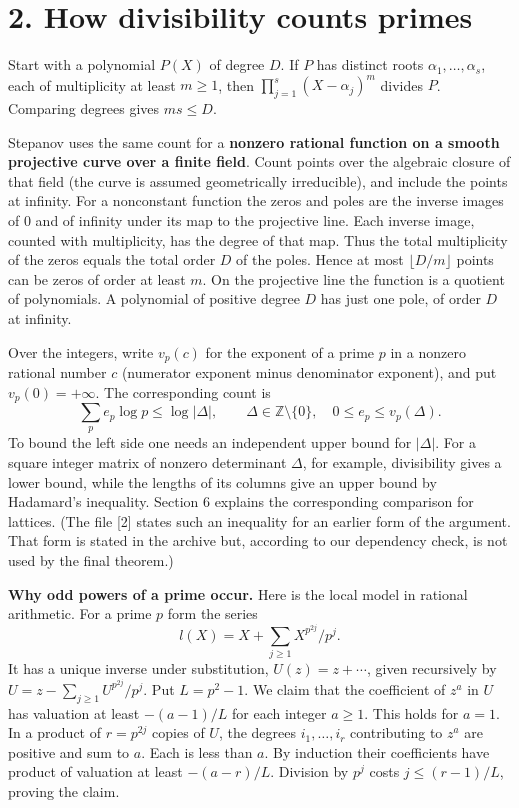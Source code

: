 \documentclass[11pt,letterpaper]{article}
\begin{document}
{\newpage
\section*{2. How divisibility counts primes}

Start with a polynomial $P(X)$ of degree $D$. If $P$ has distinct roots $\alpha_1,\ldots,\alpha_s$, each of multiplicity at least $m\ge1$, then $\prod_{j=1}^s(X-\alpha_j)^m$ divides $P$. Comparing degrees gives $ms\le D$.

Stepanov uses the same count for a \textbf{nonzero rational function on a smooth projective curve over a finite field}. Count points over the algebraic closure of that field (the curve is assumed geometrically irreducible), and include the points at infinity. For a nonconstant function the zeros and poles are the inverse images of $0$ and of infinity under its map to the projective line. Each inverse image, counted with multiplicity, has the degree of that map. Thus the total multiplicity of the zeros equals the total order $D$ of the poles. Hence at most $\lfloor D/m\rfloor$ points can be zeros of order at least $m$. On the projective line the function is a quotient of polynomials. A polynomial of positive degree $D$ has just one pole, of order $D$ at infinity.

Over the integers, write $v_p(c)$ for the exponent of a prime $p$ in a nonzero rational number $c$ (numerator exponent minus denominator exponent), and put $v_p(0)=+\infty$. The corresponding count is
\begin{equation}\label{D:41}
 \sum_p e_p\log p\le\log|\Delta|,\qquad
 \Delta\in\mathbb Z\setminus\{0\},\quad 0\le e_p\le v_p(\Delta).
\end{equation}
To bound the left side one needs an independent upper bound for $|\Delta|$. For a square integer matrix of nonzero determinant $\Delta$, for example, divisibility gives a lower bound, while the lengths of its columns give an upper bound by Hadamard's inequality. Section 6 explains the corresponding comparison for lattices. (The file [2] states such an inequality for an earlier form of the argument. That form is stated in the archive but, according to our dependency check, is not used by the final theorem.)

\textbf{Why odd powers of a prime occur.} Here is the local model in rational arithmetic. For a prime $p$ form the series
\begin{equation}\label{D:42}
 l(X)=X+\sum_{j\ge1}X^{p^{2j}}/p^j.
\end{equation}
It has a unique inverse under substitution, $U(z)=z+\cdots$, given recursively by $U=z-\sum_{j\ge1}U^{p^{2j}}/p^j$. Put $L=p^2-1$. We claim that the coefficient of $z^a$ in $U$ has valuation at least $-(a-1)/L$ for each integer $a\ge1$. This holds for $a=1$. In a product of $r=p^{2j}$ copies of $U$, the degrees $i_1,\ldots,i_r$ contributing to $z^a$ are positive and sum to $a$. Each is less than $a$. By induction their coefficients have product of valuation at least $-(a-r)/L$. Division by $p^j$ costs $j\le(r-1)/L$, proving the claim.

}
\end{document}
